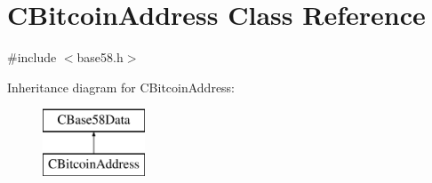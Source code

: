 \hypertarget{class_c_bitcoin_address}{}\section{C\+Bitcoin\+Address Class Reference}
\label{class_c_bitcoin_address}


{\ttfamily \#include $<$base58.\+h$>$}

Inheritance diagram for C\+Bitcoin\+Address\+:\begin{figure}[H]
\begin{center}
\leavevmode
\includegraphics[height=2.000000cm]{class_c_bitcoin_address}
\end{center}
\end{figure}
